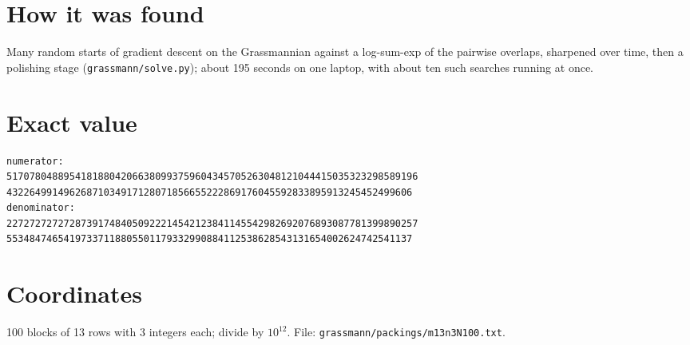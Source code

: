 \documentclass[11pt,a4paper]{article}
\begin{document}
\section{How it was found}
Many random starts of gradient descent on the Grassmannian against a log-sum-exp of the pairwise overlaps, sharpened over time, then a polishing stage (\texttt{grassmann/solve.py}); about 195 seconds on one laptop, with about ten such searches running at once.


\appendix
\section{Exact value}
{\small
\begin{verbatim}
numerator:
517078048895418188042066380993759604345705263048121044415035323298589196
43226499149626871034917128071856655222869176045592833895913245452499606
denominator:
227272727272873917484050922214542123841145542982692076893087781399890257
55348474654197337118805501179332990884112538628543131654002624742541137
\end{verbatim}}

\section{Coordinates}
100 blocks of 13 rows with 3 integers each; divide by $10^{12}$. File: \texttt{grassmann/packings/m13n3N100.txt}.
{\tiny
\begin{multicols}{3}
\end{multicols}}
\end{document}
